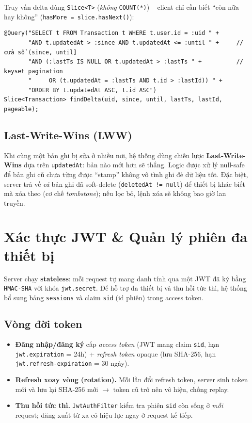 \documentclass[11pt,a4paper]{article}
\begin{document}
Truy vấn delta dùng \texttt{Slice<T>} (\emph{không} \texttt{COUNT(*)}) -- client chỉ cần
biết ``còn nữa hay không'' (\texttt{hasMore = slice.hasNext()}):

\begin{lstlisting}[style=java,caption={Truy vấn delta keyset (TransactionRepository.findDelta)}]
@Query("SELECT t FROM Transaction t WHERE t.user.id = :uid " +
       "AND t.updatedAt > :since AND t.updatedAt <= :until " +     // cửa sổ (since, until]
       "AND (:lastTs IS NULL OR t.updatedAt > :lastTs " +          // keyset pagination
       "     OR (t.updatedAt = :lastTs AND t.id > :lastId)) " +
       "ORDER BY t.updatedAt ASC, t.id ASC")
Slice<Transaction> findDelta(uid, since, until, lastTs, lastId, pageable);
\end{lstlisting}

\subsection{Last-Write-Wins (LWW)}

Khi cùng một bản ghi bị sửa ở nhiều nơi, hệ thống dùng chiến lược \textbf{Last-Write-Wins}
dựa trên \texttt{updatedAt}: bản nào mới hơn sẽ thắng. Logic được xử lý null-safe để bản
ghi cũ chưa từng được ``stamp'' không vô tình ghi đè dữ liệu tốt. Đặc biệt, server trả về
\emph{cả} bản ghi đã soft-delete (\texttt{deletedAt != null}) để thiết bị khác biết mà xóa
theo (cơ chế \emph{tombstone}); nếu lọc bỏ, lệnh xóa sẽ không bao giờ lan truyền.

\section{Xác thực JWT \& Quản lý phiên đa thiết bị}
\label{sec:auth}

Server chạy \textbf{stateless}: mỗi request tự mang danh tính qua một JWT đã ký bằng
\texttt{HMAC-SHA} với khóa \texttt{jwt.secret}. Để hỗ trợ đa thiết bị và thu hồi tức thì,
hệ thống bổ sung bảng \texttt{sessions} và claim \texttt{sid} (id phiên) trong access token.

\subsection{Vòng đời token}

\begin{itemize}[leftmargin=2em]
  \item \textbf{Đăng nhập/đăng ký} cấp \emph{access token} (JWT mang claim \texttt{sid},
        hạn \texttt{jwt.expiration} = 24h) + \emph{refresh token} opaque (lưu SHA-256,
        hạn \texttt{jwt.refresh-expiration} = 30 ngày).
  \item \textbf{Refresh xoay vòng (rotation).} Mỗi lần đổi refresh token, server sinh
        token mới và lưu lại SHA-256 mới $\rightarrow$ token cũ trở nên vô hiệu, chống
        replay.
  \item \textbf{Thu hồi tức thì.} \texttt{JwtAuthFilter} kiểm tra phiên \texttt{sid} còn
        sống ở \emph{mỗi} request; đăng xuất từ xa có hiệu lực ngay ở request kế tiếp.
\end{itemize}
\end{document}
